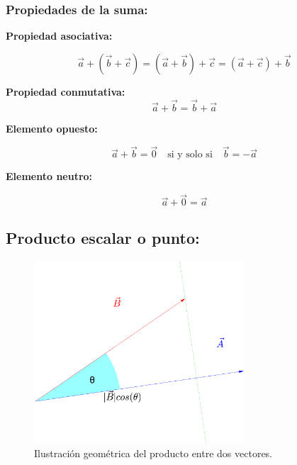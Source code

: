 \subsubsection{Propiedades de la suma:}

\textbf{Propiedad asociativa:}

\begin{equation}
 \vec{a} + (\vec{b} + \vec{c}) = (\vec{a} + \vec{b}) + \vec{c} = (\vec{a} + \vec{c}) +\vec{b} 
 \end{equation}

\textbf{Propiedad conmutativa:}
\begin{equation}
 \vec{a} + \vec{b} = \vec{b} + \vec{a}
\end{equation}

\textbf{Elemento opuesto:}

\begin{equation}
 \vec{a} + \vec{b} = \vec{0} \quad \text{si y solo si}\quad \vec{b} =-\vec{a} 
\end{equation}

\textbf{Elemento neutro:}

\begin{equation}
 \vec{a} + \vec{0} = \vec{a} 
\end{equation}

\subsection{Producto escalar o punto:}

\begin{figure}[H]
 \centering
 \includegraphics[width=0.7\textwidth]{images/vector_siete.eps}
 \caption{Ilustración geométrica del producto entre dos vectores.}
 \label{fig:escalar}
\end{figure}

